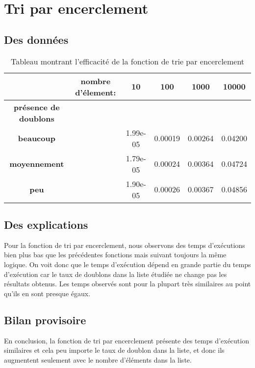 \documentclass[a4paper, 12pt]{article}
\begin{document}
\section{Tri par encerclement}
\subsection{Des données}

\begin{table}[htbp]
  \centering
  \begin{tabular}{||c c|c|c|c|c||}\hline
    \textbf{} & \textbf{nombre d'élement:} & \textbf{10} & \textbf{100} & \textbf{1000} & \textbf{10000}\\\hline\hline
    \textbf{présence de doublons} & 	& 	& 	& 	&\\\hline
    \textbf{beaucoup}           &	   & 1.99e-05    & 0.00019	& 0.00264	& 0.04200    \\\hline
    \textbf{moyennement}        &  	   & 1.79e-05    & 0.00024      & 0.00364	& 0.04724    \\\hline
    \textbf{peu}         	&          & 1.90e-05    & 0.00026      & 0.00367	& 0.04856    \\\hline
  \end{tabular}
  \caption{Tableau montrant l'efficacité de la fonction de trie par encerclement}
  \label{montableau4}
\end{table}

\subsection{Des explications}

Pour la fonction de tri par encerclement, nous observons des temps d’exécutions bien plus bas que les précédentes fonctions mais suivant toujours la même logique. On voit donc que le temps d’exécution dépend en grande partie du temps d’exécution car le taux de doublons dans la liste étudiée ne change pas les résultats obtenus. Les temps observés sont pour la plupart très similaires au point qu’ils en sont presque égaux. 

\subsection{Bilan provisoire}

En conclusion, la fonction de tri par encerclement présente des temps d’exécution similaires et cela peu importe le taux de doublon dans la liste, et donc ils augmentent seulement avec le nombre d’éléments dans la liste.
\end{document}

